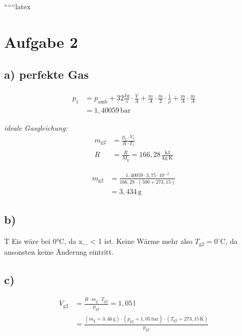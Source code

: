 
``````latex


\section*{Aufgabe 2}

\subsection*{a) perfekte Gas}

\begin{align*}
p_1 &= p_{\text{amb}} + 32 \frac{kg}{s} \cdot \frac{\dot{V}}{A} + \frac{\dot{m}}{A} \cdot \frac{\dot{m}}{2} \cdot \frac{1}{\rho} + \frac{\dot{m}}{A} \cdot \frac{\dot{m}}{A} \\
&= 1,40059 \, \text{bar}
\end{align*}

\textit{ideale Gasgleichung:}
\begin{align*}
m_{\text{g2}} &= \frac{p_2 \cdot V_1}{R \cdot T_1} \\
R &= \frac{\bar{R}}{M_{\text{g}}} = 166,28 \, \frac{\text{kJ}}{\text{kg} \cdot \text{K}}
\end{align*}

\begin{align*}
m_{\text{g2}} &= \frac{1,40059 \cdot 3,75 \cdot 10^{-2}}{166,28 \cdot (500 + 273,15)} \\
&= 3,434 \, \text{g}
\end{align*}

\subsection*{b)}

T Eis wäre bei 0°C, da x_{} < 1 ist. Keine Wärme mehr also $T_{\text{g2}} = 0^\circ$C, da ansonsten keine Änderung eintritt.

\subsection*{c)}

\begin{align*}
V_{\text{g2}} &= \frac{R \cdot m_{\text{g}} \cdot T_{\text{g2}}}{p_{\text{g2}}} = 1,05 \, \text{l} \\
&= \frac{(m_{\text{g}} = 3,46 \, \text{g}) \cdot (p_{\text{g2}} = 1,05 \, \text{bar}) \cdot (T_{\text{g2}} = 273,15 \, \text{K})}{p_{\text{g2}}}
\end{align*}

